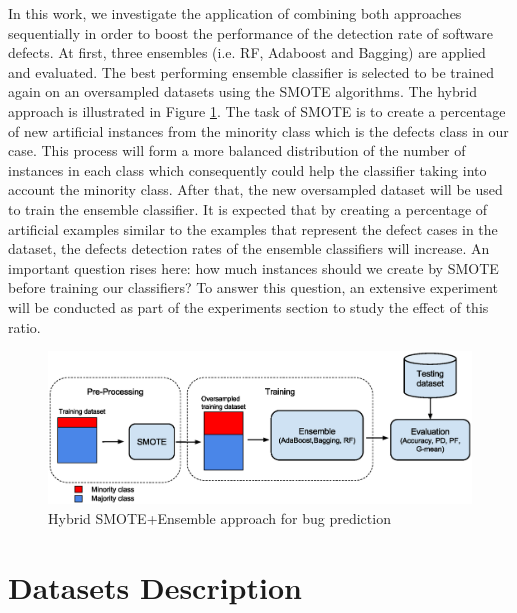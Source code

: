 \documentclass[runningheads,a4paper]{llncs}
\begin{document}
In this work, we investigate the application of combining both approaches sequentially in order to boost the performance of the detection rate of software defects. At first, three ensembles (i.e. RF, Adaboost and Bagging) are applied and evaluated. The best performing ensemble classifier is selected to be trained again on an oversampled datasets using the SMOTE algorithms. The hybrid approach is illustrated in Figure \ref{fig:SMOTE+Ensemble}. The task of SMOTE is to create a percentage of new artificial instances from the minority class which is the defects class in our case. This process will form a more balanced distribution of the number of instances in each class which consequently could help the classifier taking into account the minority class. After that, the new oversampled dataset will be used to train the ensemble classifier. It is expected that by creating a percentage of artificial examples similar to the examples that represent the defect cases in the dataset, the defects detection rates of the ensemble classifiers will increase. An important question rises here: how much instances should we create by SMOTE before training our classifiers? To answer this question, an extensive experiment will be conducted as part of the experiments section to study the effect of this ratio.
 
 \begin{figure}[h]
\label{fig:ss}
\begin{center}
\includegraphics[scale=0.45]{Framework.eps}
\caption{Hybrid SMOTE+Ensemble approach for bug prediction}
\end{center}
\label{fig:SMOTE+Ensemble}
\end{figure}


\section{Datasets Description}
\label{data}
\end{document}
